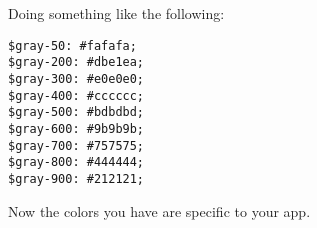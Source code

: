 Doing something like the following:
\begin{lstlisting}
$gray-50: #fafafa;
$gray-200: #dbe1ea;
$gray-300: #e0e0e0;
$gray-400: #cccccc;
$gray-500: #bdbdbd;
$gray-600: #9b9b9b;
$gray-700: #757575;
$gray-800: #444444;
$gray-900: #212121;
\end{lstlisting}

Now the colors you have are specific to your app.
